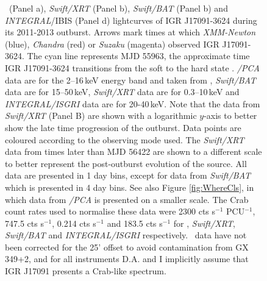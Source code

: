 \begin{figure}
    \caption[Lightcurves of IGR J17091-3624, from a number of instruments, during its 2011-2013 outburst.]{\rxte\ (Panel a), \textit{Swift/XRT} (Panel b), \textit{Swift/BAT} (Panel b) and \textit{INTEGRAL}/IBIS (Panel d) lightcurves of IGR J17091-3624 during its 2011-2013 outburst.  Arrows mark times at which \textit{XMM-Newton} (blue), \textit{Chandra} (red) or \textit{Suzaku} (magenta) observed IGR J17091-3624.  The cyan line represents MJD 55963, the approximate time IGR J17091-3624 transitions from the soft to the hard state \citep{Drave_Return}.  \rxte \textit{/PCA} \citep{Jahoda_PCA} data are for the 2--16\,keV energy band and taken from \citep{Altamirano_IGR_FH}, \textit{Swift/BAT} \citep{Barthelmy_BAT} data are for 15--50\,keV, \textit{Swift/XRT} \citep{Burrows_XRT}  data are for 0.3--10\,keV and \textit{INTEGRAL/ISGRI} \citep{Ubertini_IBIS} data are for 20-40\,keV.  Note that the data from \textit{Swift/XRT} (Panel B) are shown with a logarithmic $y$-axis to better show the late time progression of the outburst.  Data points are coloured according to the observing mode used.  The \textit{Swift/XRT} data from times later than MJD 56422 are shown to a different scale to better represent the post-outburst evolution of the source.  All data are presented in 1 day bins, except for data from \textit{Swift/BAT} which is presented in 4 day bins.  See also Figure \ref{fig:WhereCls}, in which data from \rxte \textit{/PCA} is presented on a smaller scale.  The Crab count rates used to normalise these data were 2300 cts s$^{-1}$ PCU$^{-1}$, 747.5 cts s$^{-1}$, 0.214 cts s$^{-1}$ and 183.5 cts s$^{-1}$ for \rxte , \textit{Swift/XRT}, \textit{Swift/BAT} and \textit{INTEGRAL/ISGRI} respectively.  \rxte\ data have not been corrected for the 25' offset to avoid contamination from GX 349+2, and for all instruments \textsf{D.A.} and I implicitly assume that IGR J17091 presents a Crab-like spectrum.}
   \label{fig:allmissions}
\end{figure}

\subsection{\rxte}

\label{sec:XTEDA}

